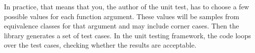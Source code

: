 
\vskip 6pt
In practice, that means that you, the author of the unit test, has to choose a few possible values for each function argument. These values will be samples from equivalence classes for that argument and may include corner cases. Then the \utd library generates a set of test cases. In the unit testing framework, the code loops over the test cases, checking whether the results are acceptable.

